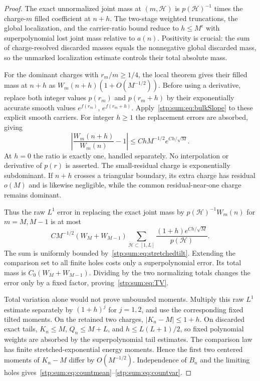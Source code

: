 \documentclass[11pt]{article}
\theoremstyle{remark}\newtheorem{remark}[theorem]{Remark}
\newcommand{\cH}{\mathcal H}
\begin{document}
\begin{proof}
The exact unnormalized joint mass at $(m,\cH)$ is $p(\cH)^{-1}$ times the charge-$m$ filled coefficient at $n+h$. The two-stage weighted truncations, the global localization, and the carrier-ratio bound reduce to $h\le M^\epsilon$ with superpolynomial lost joint mass relative to $a(n)$. Positivity is crucial: the sum of charge-resolved discarded masses equals the nonnegative global discarded mass, so the unmarked localization estimate controls their total absolute mass.

For the dominant charges with $r_m/m\ge1/4$, the local theorem gives their filled mass at $n+h$ as $W_m(n+h)(1+O(M^{-1/2}))$. Before using a derivative, replace both integer values $p(r_m)$ and $p(r_m+h)$ by their exponentially accurate smooth values $e^{f(r_m)}$, $e^{f(r_m+h)}$. Apply~\eqref{stp:sum:eq:bulkSlope} to these explicit smooth carriers. For integer $h\ge1$ the replacement errors are absorbed, giving
\begin{equation}\label{stp:sum:eq:WratioTV}
 \left|\frac{W_m(n+h)}{W_m(n)}-1\right|
 \le ChM^{-1/2}e^{Ch/\sqrt M}.
\end{equation}
At $h=0$ the ratio is exactly one, handled separately. No interpolation or derivative of $p(r)$ is asserted. The small-residual charge is exponentially subdominant. If $n+h$ crosses a triangular boundary, its extra charge has residual $o(M)$ and is likewise negligible, while the common residual-near-one charge remains dominant.

Thus the raw $L^1$ error in replacing the exact joint mass by
$p(\cH)^{-1}W_m(n)$ for $m=M,M-1$ is at most
\[
 CM^{-1/2}(W_M+W_{M-1})
 \sum_{\cH\subset[1,L]}\frac{(1+h)e^{Ch/\sqrt M}}{p(\cH)}.
\]
The sum is uniformly bounded by~\eqref{stp:sum:eq:stretchedtilt}. Extending the comparison set to all finite holes costs only a superpolynomial error. Its total mass is $C_0(W_M+W_{M-1})$. Dividing by the two normalizing totals changes the error only by a fixed factor, proving~\eqref{stp:sum:eq:TV}.

Total variation alone would not prove unbounded moments. Multiply this raw $L^1$ estimate separately by $(1+h)^j$ for $j=1,2$, and use the corresponding fixed tilted moments. On the retained two charges, $|K_n-M|\le1+h$. On discarded exact tails, $K_n\le M$, $Q_n\le M+L$, and $h\le L(L+1)/2$, so fixed polynomial weights are absorbed by the superpolynomial tail estimates. The comparison law has finite stretched-exponential energy moments. Hence the first two centered moments of $K_n-M$ differ by $O(M^{-1/2})$. Independence of $B_n$ and the limiting holes gives~\eqref{stp:sum:eq:countmean}--\eqref{stp:sum:eq:countvar}.
\end{proof}
\end{document}
